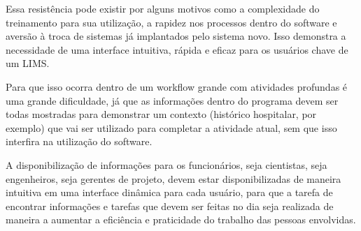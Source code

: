 Essa resistência pode existir por alguns motivos como a complexidade do treinamento para sua utilização,  a rapidez nos processos dentro do software e aversão à troca de sistemas já implantados pelo sistema novo. Isso demonstra a necessidade de uma interface intuitiva, rápida e eficaz para os usuários chave de um LIMS.

Para que isso ocorra dentro de um workflow grande com atividades profundas é uma grande dificuldade, já que as informações dentro do programa devem ser todas mostradas para demonstrar um contexto (histórico hospitalar, por exemplo) que vai ser utilizado para completar a atividade atual, sem que isso interfira na utilização do software.


A disponibilização de informações para os funcionários, seja cientistas, seja engenheiros, seja gerentes de projeto, devem estar disponibilizadas de maneira intuitiva em uma interface dinâmica para cada usuário, para que a tarefa de encontrar informações e tarefas que devem ser feitas no dia seja realizada de maneira a aumentar a eficiência e praticidade do trabalho das pessoas envolvidas.